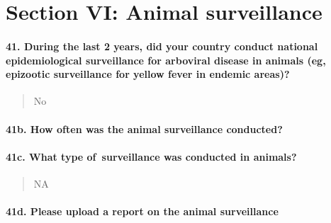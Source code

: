 \documentclass[
]{article}
\begin{document}
\hypertarget{section-vi-animal-surveillance}{%
\section{Section VI: Animal
surveillance}\label{section-vi-animal-surveillance}}

\hypertarget{during-the-last-2-years-did-your-country-conduct-national-epidemiological-surveillance-for-arboviral-disease-in-animals-eg-epizootic-surveillance-for-yellow-fever-in-endemic-areas}{%
\paragraph{41. During the last 2 years, did your country conduct
national epidemiological surveillance for arboviral disease in animals
(eg, epizootic surveillance for yellow fever in endemic
areas)?}\label{during-the-last-2-years-did-your-country-conduct-national-epidemiological-surveillance-for-arboviral-disease-in-animals-eg-epizootic-surveillance-for-yellow-fever-in-endemic-areas}}

\begin{quote}
No
\end{quote}

\hypertarget{b.-how-often-was-the-animal-surveillance-conducted}{%
\paragraph{41b. How often was the animal surveillance
conducted?}\label{b.-how-often-was-the-animal-surveillance-conducted}}

\begin{quote}
\end{quote}

\hypertarget{c.-what-type-of-surveillance-was-conducted-in-animals}{%
\paragraph{41c. What type of~surveillance was conducted in
animals?}\label{c.-what-type-of-surveillance-was-conducted-in-animals}}

\begin{quote}
NA
\end{quote}

\hypertarget{d.-please-upload-a-report-on-the-animal-surveillance}{%
\paragraph{41d. Please upload a report on the animal
surveillance}\label{d.-please-upload-a-report-on-the-animal-surveillance}}
\end{document}
